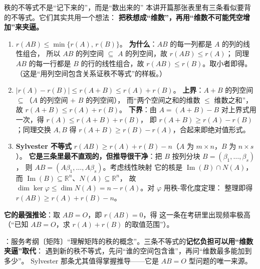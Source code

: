 \begin{fdeep}{秩的不等式不是“记下来的”，而是“数出来的”}
本讲开篇那张表里有三条看似要背的不等式。它们其实共用一个想法：
\textbf{把秩想成“维数”，再用“维数不可能凭空增加”来夹逼。}
\begin{enumerate}[leftmargin=2.2em,itemsep=0.25em]
\item $r(AB)\le\min\{r(A),\,r(B)\}$。
      \textbf{为什么}：$AB$ 的每一列都是 $A$ 的列的线性组合，
      所以 $AB$ 的列空间 $\subseteq$ $A$ 的列空间，故 $r(AB)\le r(A)$；
      同理 $AB$ 的每一行都是 $B$ 的行的线性组合，故 $r(AB)\le r(B)$。取小者即得。
      （这是“用列空间包含关系证秩不等式”的样板。）
\item $\lvert r(A)-r(B)\rvert\le r(A+B)\le r(A)+r(B)$。
      \textbf{上界}：$A+B$ 的列空间 $\subseteq$（$A$ 的列空间 $+$ $B$ 的列空间），
      而“两个空间之和的维数 $\le$ 维数之和”，故 $r(A+B)\le r(A)+r(B)$。
      \textbf{下界}：由 $A=(A+B)-B$ 对上界式用一次，得 $r(A)\le r(A+B)+r(B)$，
      即 $r(A+B)\ge r(A)-r(B)$；同理交换 $A,B$ 得 $r(A+B)\ge r(B)-r(A)$，合起来即绝对值形式。
\item \textbf{Sylvester 不等式} $r(AB)\ge r(A)+r(B)-n$（$A$ 为 $m\times n$，$B$ 为 $n\times s$）。
      \textbf{它是三条里最不直观的，但推导很干净}：把 $B$ 按列分块 $B=(\beta_1,\dots,\beta_s)$，
      则 $AB=(A\beta_1,\dots,A\beta_s)$。考虑线性映射
      它的核是 $\operatorname{Im}(B)\cap N(A)$，而 $\operatorname{Im}(B)\subseteq\mathbb{R}^{n}$、$N(A)\subseteq\mathbb{R}^{n}$，
      故 $\dim\ker\varphi\le\dim N(A)=n-r(A)$。对 $\varphi$ 用秩-零化度定理：
      整理即得 $r(AB)\ge r(A)+r(B)-n$。
\end{enumerate}
\textbf{它的最强推论}：取 $AB=O$，即 $r(AB)=0$，得
这一条在考研里出现频率极高（“已知 $AB=O$，求 $r(A)+r(B)$ 的取值范围”）。

\fbref{}：服务考纲〔矩阵〕“理解矩阵的秩的概念”。三条不等式的\textbf{记忆负担可以用“维数夹逼”取代}：
遇到新的秩不等式，先问“谁的空间包含谁”，再问“维数最多能加到多少”。
Sylvester 那条尤其值得掌握推导——它是 $AB=O$ 型问题的唯一来源。
\end{fdeep}

